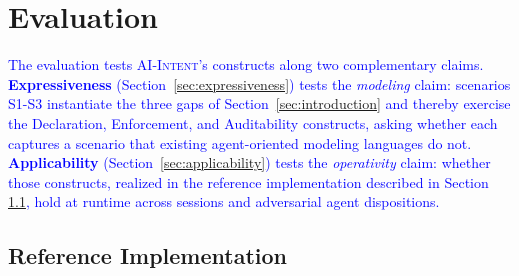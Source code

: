 \documentclass[runningheads]{llncs}
\begin{document}
\section{Evaluation}
\label{sec:evaluation}


\textcolor{blue}{The evaluation tests \textsc{AI-Intent}'s constructs along two complementary claims. \textbf{Expressiveness} (Section~\ref{sec:expressiveness}) tests the \emph{modeling} claim: scenarios S1-S3 instantiate the three gaps of Section~\ref{sec:introduction} and thereby exercise the Declaration,  Enforcement, and Auditability constructs, asking whether each captures a scenario that existing agent-oriented modeling languages do not. \textbf{Applicability} (Section~\ref{sec:applicability}) tests the \emph{operativity} claim: whether those constructs, realized in the reference implementation described in Section \ref{sec:implementation},  hold at runtime across sessions and adversarial agent dispositions.} 

\subsection{Reference Implementation}
\label{sec:implementation}
\end{document}
